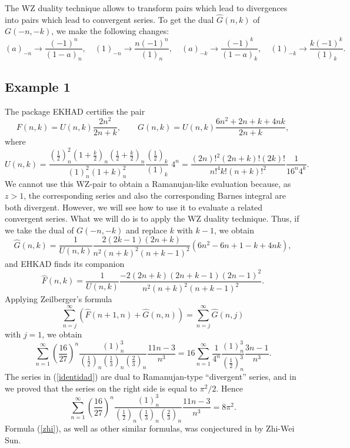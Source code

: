 \documentclass[12pt,a4paper]{amsart}
\begin{document}
The WZ duality technique \cite[Ch. 7]{petkovsek} allows to transform pairs which lead to divergences into pairs which lead to convergent series. To get the dual $\widehat{G}(n,k)$ of $G(-n,-k)$, we make the following changes:
\[
(a)_{-n} \rightarrow \frac{(-1)^n}{(1-a)_n}, \quad (1)_{-n} \rightarrow \frac{n(-1)^n}{(1)_n}, \quad (a)_{-k} \rightarrow \frac{(-1)^k}{(1-a)_k}, \quad (1)_{-k} \rightarrow \frac{k(-1)^k}{(1)_k}.
\]

\subsection*{Example 1}
The package EKHAD certifies the pair
\begin{equation}
F(n,k)=U(n,k) \frac{2n^2}{2n+k}, \qquad G(n,k)=U(n,k) \frac{6n^2+2n+k+4nk}{2n+k},
\end{equation}
where
\[
U(n,k)=\frac{\left(\frac{1}{2} \right)_n^2 \left(1+\frac{k}{2}\right)_n \left(\frac{1}{2}+\frac{k}{2}\right)_n}{(1)_n^2(1+k)_n^2}
\frac{\left(\frac{1}{2}\right)_k}{(1)_k} \, \, 4^n= \frac{(2n)!^2(2n+k)!(2k)!}{n!^4 k! (n+k)!^2} \frac{1}{16^n 4^k}.
\]
We cannot use this WZ-pair to obtain a Ramanujan-like evaluation because, as $z>1$, the corresponding series and also the corresponding Barnes integral are both divergent. However, we will see how to use it to evaluate a related convergent series. What we will do is to apply the WZ duality technique. Thus, if we take the dual of $G(-n,-k)$ and replace $k$ with $k-1$, we obtain
\[
\widehat{G}(n,k)=\frac{1}{U(n,k)} \frac{2(2k-1)(2n+k)}{n^2(n+k)^2(n+k-1)^2} (6n^2-6n+1-k+4nk),
\]
and EHKAD finds its companion
\[ \widehat{F}(n,k)=\frac{1}{U(n,k)} \frac{-2(2n+k)(2n+k-1)(2n-1)^2}{n^2(n+k)^2(n+k-1)^2}. \]
Applying Zeilberger's formula
\[
\sum_{n=j}^{\infty} (\widehat{F}(n+1,n)+\widehat{G}(n,n))=\sum_{n=j}^{\infty} \widehat{G}(n,j)
\]
with $j=1$, we obtain
\begin{equation}\label{identidad}
\sum_{n=1}^{\infty} \left( \frac{16}{27} \right)^n \frac{(1)_n^3}{\left(\frac{1}{2} \right)_n \left( \frac{1}{3} \right)_n \left(\frac{2}{3} \right)_n} \frac{11n-3}{n^3}=16 \sum_{n=1}^{\infty} \frac{1}{4^n} \frac{(1)_n^3}{\left(\frac{1}{2} \right)_n^3} \frac{3n-1}{n^3}.
\end{equation}
The series in (\ref{identidad}) are dual to Ramanujan-type ``divergent'' series, and in \cite[p. 221]{gui-hyperiden} we proved that the series on the right side is equal to $\pi^2/2$. Hence
\begin{equation}\label{zhi}
\sum_{n=1}^{\infty} \left( \frac{16}{27} \right)^n \frac{(1)_n^3}{\left(\frac{1}{2} \right)_n \left( \frac{1}{3} \right)_n \left(\frac{2}{3} \right)_n} \frac{11n-3}{n^3}=8 \pi^2.
\end{equation}
Formula (\ref{zhi}), as well as other similar formulas, was conjectured in \cite[Conj 1.4]{sun} by Zhi-Wei Sun.
\end{document}
